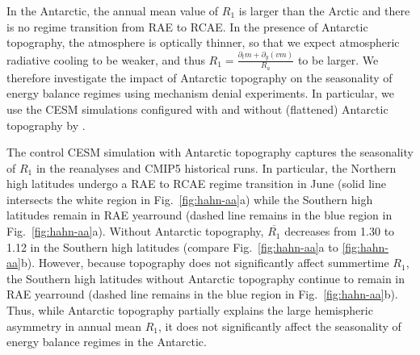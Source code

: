 \documentclass{ametsocV5}
\begin{document}


  In the Antarctic, the annual mean value of $R_1$ is larger than the Arctic and there is no regime transition from RAE to RCAE. In the presence of Antarctic topography, the atmosphere is optically thinner, so that we expect atmospheric radiative cooling to be weaker, and thus $R_1=\frac{\partial_t m + \partial_y (vm)}{R_a}$ to be larger. We therefore investigate the impact of Antarctic topography on the seasonality of energy balance regimes using mechanism denial experiments. In particular, we use the CESM simulations configured with and without (flattened) Antarctic topography by \cite{hahn2020}.

  The control CESM simulation with Antarctic topography captures the seasonality of $R_1$ in the reanalyses and CMIP5 historical runs. In particular, the Northern high latitudes undergo a RAE to RCAE regime transition in June (solid line intersects the white region in Fig.~\ref{fig:hahn-aa}a) while the Southern high latitudes remain in RAE yearround (dashed line remains in the blue region in Fig.~\ref{fig:hahn-aa}a). Without Antarctic topography, $\overline{R_1}$ decreases from 1.30 to 1.12 in the Southern high latitudes (compare Fig.~\ref{fig:hahn-aa}a to \ref{fig:hahn-aa}b). However, because topography does not significantly affect summertime $R_1$, the Southern high latitudes without Antarctic topography continue to remain in RAE yearround (dashed line remains in the blue region in Fig.~\ref{fig:hahn-aa}b). Thus, while Antarctic topography partially explains the large hemispheric asymmetry in annual mean $R_1$, it does not significantly affect the seasonality of energy balance regimes in the Antarctic.
\end{document}
